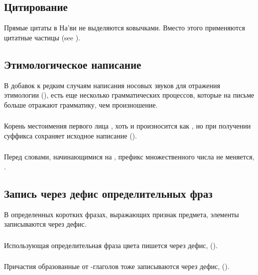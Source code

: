 \subsection{Цитирование} Прямые цитаты в На'ви не выделяются ковычками.  Вместо этого применяются цитатные частицы
 (see ).

\subsection{Этимологическое написание} В добавок к редким случаям написания носовых звуков для отражения этимологии (),
есть еще несколько грамматических процессов, которые на письме больше отражают грамматику, чем произношение.

\subsubsection{} Корень местоимения первого лица , хоть и
произносится как , но при получении суффикса сохраняет исходное написание
().

\subsubsection{} Перед словами, начинающимися на , префикс множественного числа
 не меняется, .

\subsection{Запись через дефис определительных фраз} В определенных коротких фразах, выражающих признак предмета, элементы записываются через дефис.

\subsubsection{} Использующая   определительная фраза цвета
пишется через дефис,   ().

\subsubsection{} Причастия образованные от  -глаголов тоже записываются через дефис,  
().


